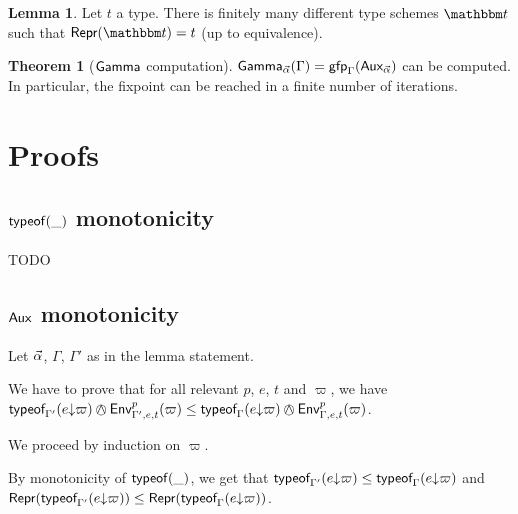 \documentclass[a4paper]{article}
\theoremstyle{definition}
\newtheorem{theorem}{Theorem}
\newtheorem{lemma}{Lemma}
\begin{document}
        \begin{lemma}
          Let $t$ a type. There is finitely many different type schemes $\ts$ such that $\tsrep \ts = t$ (up to equivalence).
        \end{lemma}

        \begin{theorem}[$\textsf{Gamma}_{}$ computation]
          $\textsf{Gamma}_{\vec \alpha}(\Gamma)=\textsf{gfp}_\Gamma (\textsf{Aux}_{\vec \alpha})$ can be computed.
          In particular, the fixpoint can be reached in a finite number of iterations.
        \end{theorem}

    \section{Proofs}

    \subsection{$\textsf{typeof}_{}(\_)$ monotonicity}
    
    TODO

    \subsection{$\textsf{Aux}_{}$ monotonicity}

      Let $\vec \alpha$, $\Gamma$, $\Gamma'$ as in the lemma statement.

      We have to prove that for all relevant $p$, $e$, $t$ and $\varpi$,
      we have $\tyof {\occ e \varpi} {\Gamma'} \tsand \Gp p {\Gamma',e,t} (\varpi) \leq \tyof {\occ e \varpi} {\Gamma} \tsand \Gp p {\Gamma,e,t} (\varpi)$.

      We proceed by induction on $\varpi$. 

      By monotonicity of $\textsf{typeof}_{}(\_)$, we get that
      $\textsf{typeof}_{\Gamma'}(e{\downarrow}\varpi) \leq \textsf{typeof}_{\Gamma}(e{\downarrow}\varpi)$
      and $\textsf{Repr}(\textsf{typeof}_{\Gamma'}(e{\downarrow}\varpi)) \leq \textsf{Repr}(\textsf{typeof}_{\Gamma}(e{\downarrow}\varpi))$.
\end{document}
